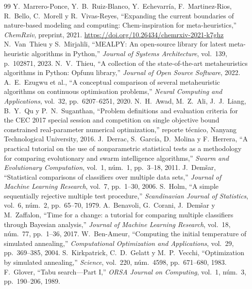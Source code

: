 \documentclass[11pt,letterpaper]{article}
\begin{document}
\begin{thebibliography}{99}
\small
{} Y.~Marrero-Ponce, Y.~B.~Ruiz-Blanco, Y.~Echevarría, F.~Martinez-Rios, R.~Bello, C.~Morell y R.~Vivas-Reyes, ``Expanding the current boundaries of nature-based modeling and computing: Chem-inspiration for meta-heuristics,'' \emph{ChemRxiv}, preprint, 2021. \url{https://doi.org/10.26434/chemrxiv-2021-k7ghz}
 N.~Van~Thieu y S.~Mirjalili, ``MEALPY: An open-source library for latest meta-heuristic algorithms in Python,'' \emph{Journal of Systems Architecture}, vol.~139, p.~102871, 2023.
 N.~V.~Thieu, ``A collection of the state-of-the-art metaheuristics algorithms in Python: Opfunu library,'' \emph{Journal of Open Source Software}, 2022.
 A.~E.~Ezugwu et al., ``A conceptual comparison of several metaheuristic algorithms on continuous optimisation problems,'' \emph{Neural Computing and Applications}, vol.~32, pp.~6207--6251, 2020.
 N.~H.~Awad, M.~Z.~Ali, J.~J.~Liang, B.~Y.~Qu y P.~N.~Suganthan, ``Problem definitions and evaluation criteria for the CEC 2017 special session and competition on single objective bound constrained real-parameter numerical optimization,'' reporte técnico, Nanyang Technological University, 2016.
 J.~Derrac, S.~García, D.~Molina y F.~Herrera, ``A practical tutorial on the use of nonparametric statistical tests as a methodology for comparing evolutionary and swarm intelligence algorithms,'' \emph{Swarm and Evolutionary Computation}, vol.~1, núm.~1, pp.~3--18, 2011.
 J.~Demšar, ``Statistical comparisons of classifiers over multiple data sets,'' \emph{Journal of Machine Learning Research}, vol.~7, pp.~1--30, 2006.
 S.~Holm, ``A simple sequentially rejective multiple test procedure,'' \emph{Scandinavian Journal of Statistics}, vol.~6, núm.~2, pp.~65--70, 1979.
 A.~Benavoli, G.~Corani, J.~Demšar y M.~Zaffalon, ``Time for a change: a tutorial for comparing multiple classifiers through Bayesian analysis,'' \emph{Journal of Machine Learning Research}, vol.~18, núm.~77, pp.~1--36, 2017.
 W.~Ben-Ameur, ``Computing the initial temperature of simulated annealing,'' \emph{Computational Optimization and Applications}, vol.~29, pp.~369--385, 2004.
 S.~Kirkpatrick, C.~D.~Gelatt y M.~P.~Vecchi, ``Optimization by simulated annealing,'' \emph{Science}, vol.~220, núm.~4598, pp.~671--680, 1983.
 F.~Glover, ``Tabu search---Part I,'' \emph{ORSA Journal on Computing}, vol.~1, núm.~3, pp.~190--206, 1989.

\end{thebibliography}
\end{document}
